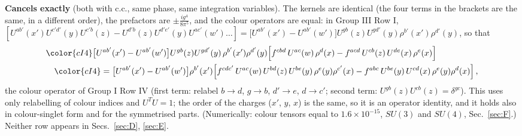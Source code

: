 \endgroup
\noindent\textbf{Cancels exactly} (both with c.c., same phase, same integration variables). The kernels are identical (the four terms in the brackets are the same, in a different order), the prefactors are $\pm\frac{ig^{4}}{8\pi^{5}}$, and the colour operators are equal: in Group III Row I, $[U^{ab'}(x')U^{c'd'}(y)U^{c'b}(z)-U^{d'b}(z)U^{d'e'}(y)U^{ac'}(w')\dots]=\big[U^{ab'}(x')-U^{ab'}(w')\big]U^{gb}(z)U^{gd'}(y)\rho^{b'}(x')\rho^{d'}(y)$, so that
\begin{align}
&{\color{cI4}\big[U^{ab'}(x')-U^{ab'}(w')\big]U^{gb}(z)U^{gd'}(y)\,\rho^{b'}(x')\rho^{d'}(y)\Big[f^{cbd}\,U^{ac}(w)\,\rho^{d}(x)-f^{acd}\,U^{cb}(z)\,U^{de}(x)\,\rho^{e}(x)\Big]}\notag\\
&\quad{\color{cI4}=\big[U^{ab'}(x')-U^{ab'}(w')\big]\rho^{b'}(x')\Big[f^{cdc'}\,U^{ac}(w)\,U^{bd}(z)\,U^{be}(y)\,\rho^{e}(y)\rho^{c'}(x)-f^{abc}\,U^{be}(y)\,U^{cd}(x)\,\rho^{e}(y)\rho^{d}(x)\Big]}\,,\notag
\end{align}
the colour operator of Group I Row IV (first term: relabel $b\to d$, $g\to b$, $d'\to e$, $d\to c'$; second term: $U^{gb}(z)U^{cb}(z)=\delta^{gc}$). This uses only relabelling of colour indices and $U^{T}U=1$; the order of the charges ($x'$, $y$, $x$) is the same, so it is an operator identity, and it holds also in colour-singlet form and for the symmetrised parts. (Numerically: colour tensors equal to $1.6\times10^{-15}$, $SU(3)$ and $SU(4)$, Sec.~\ref{sec:F}.) Neither row appears in Secs.~\ref{sec:D}, \ref{sec:E}.

